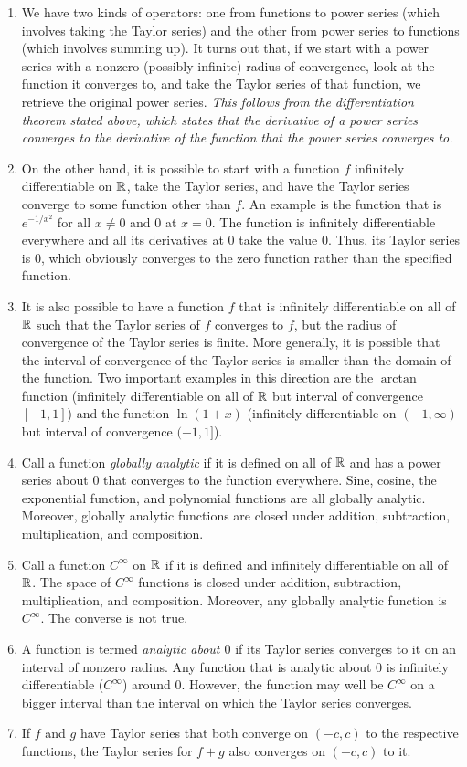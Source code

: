 \documentclass[10pt]{amsart}
\begin{document}
\begin{enumerate}
\item We have two kinds of operators: one from functions to power
  series (which involves taking the Taylor series) and the other from
  power series to functions (which involves summing up). It turns out
  that, if we start with a power series with a nonzero (possibly
  infinite) radius of convergence, look at the function it converges
  to, and take the Taylor series of that function, we retrieve the
  original power series. {\em This follows from the differentiation
  theorem stated above, which states that the derivative of a power
  series converges to the derivative of the function that the power
  series converges to.}
\item On the other hand, it is possible to start with a function $f$
  infinitely differentiable on $\mathbb{R}$, take the Taylor series, and have
  the Taylor series converge to some function other than $f$. An
  example is the function that is $e^{-1/x^2}$ for all $x \ne 0$ and
  $0$ at $x = 0$. The function is infinitely differentiable everywhere
  and all its derivatives at $0$ take the value $0$. Thus, its Taylor
  series is $0$, which obviously converges to the zero function rather
  than the specified function.
\item It is also possible to have a function $f$ that is infinitely
  differentiable on all of $\mathbb{R}$ such that the Taylor series of $f$
  converges to $f$, but the radius of convergence of the Taylor series
  is finite. More generally, it is possible that the interval of
  convergence of the Taylor series is smaller than the domain of the
  function. Two important examples in this direction are the $\arctan$
  function (infinitely differentiable on all of $\mathbb{R}$ but interval of
  convergence $[-1,1]$) and the function $\ln(1 + x)$ (infinitely
  differentiable on $(-1,\infty)$ but interval of convergence $(-1,1]$).
\item Call a function {\em globally analytic} if it is defined on all
  of $\mathbb{R}$ and has a power series about $0$ that converges to the
  function everywhere. Sine, cosine, the exponential function, and
  polynomial functions are all globally analytic. Moreover, globally
  analytic functions are closed under addition, subtraction,
  multiplication, and composition.
\item Call a function $C^\infty$ on $\mathbb{R}$ if it is defined and
  infinitely differentiable on all of $\mathbb{R}$. The space of $C^\infty$
  functions is closed under addition, subtraction, multiplication, and
  composition. Moreover, any globally analytic function is
  $C^\infty$. The converse is not true.
\item A function is termed {\em analytic about $0$} if its Taylor
  series converges to it on an interval of nonzero radius. Any
  function that is analytic about $0$ is infinitely differentiable
  ($C^\infty$) around $0$. However, the function may well be
  $C^\infty$ on a bigger interval than the interval on which the
  Taylor series converges.
\item If $f$ and $g$ have Taylor series that both converge on $(-c,c)$
  to the respective functions, the Taylor series for $f + g$ also
  converges on $(-c,c)$ to it.
\end{enumerate}
\end{document}
